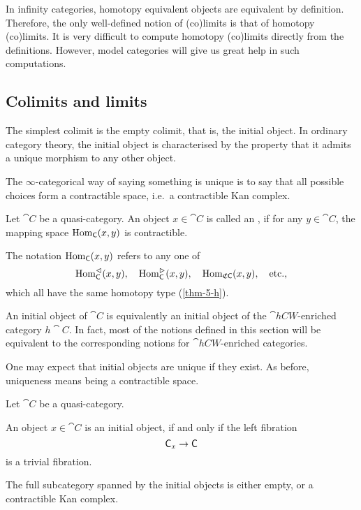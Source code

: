 In infinity categories,
homotopy equivalent objects are equivalent by definition.
Therefore, the only well-defined notion of (co)limits 
is that of homotopy (co)limits.
It is very difficult to compute homotopy (co)limits
directly from the definitions.
However, model categories will give us great help in such computations.

\subsection{Colimits and limits}

The simplest colimit is the empty colimit, that is, the initial object.
In ordinary category theory, the initial object is characterised by
the property that it admits a unique morphism to any other object.

The $\infty$-categorical way of saying something is unique 
is to say that all possible choices form a contractible space,
i.e.\ a contractible Kan complex.

\begin{definition}
    Let $\cat C$ be a quasi-category.
    An object $x\in\cat C$ is called an ,
    if for any $y\in\cat C$, the mapping space $\operatorname{Hom}_{\mathsf{C}}(x,y)$ is contractible.
\end{definition}

The notation $\operatorname{Hom}_{\mathsf{C}}(x,y)$ refers to any one of
\[\operatorname{Hom}_{\mathsf{C}}^\vartriangleleft(x,y),\quad
\operatorname{Hom}_{\mathsf{C}}^\vartriangleright(x,y),\quad 
\operatorname{Hom}_{\mathfrak C\mathsf{C}}(x,y),\quad\text{etc.,} \]
which all have the same homotopy type (\ref{thm-5-h}).

\begin{remark}
    An initial object of $\cat C$
    is equivalently an initial object of the $\cat{hCW}$-enriched category $h\cat C$.
    In fact, most of the notions defined in this section will be equivalent to 
    the corresponding notions for $\cat{hCW}$-enriched categories. \varqed
\end{remark}

One may expect that initial objects are unique if they exist.
As before, uniqueness means being a contractible space.

\begin{proposition}
    Let $\cat C$ be a quasi-category.
    \begin{itms}
        \item An object $x\in\cat C$ is an initial object, if and only if
        the left fibration
        \[ \mathsf{C}_{x\/}\to\mathsf{C} \]
        is a trivial fibration.
        \item The full subcategory spanned by the initial objects 
        is either empty, or a contractible Kan complex.
    \end{itms}
\end{proposition}

